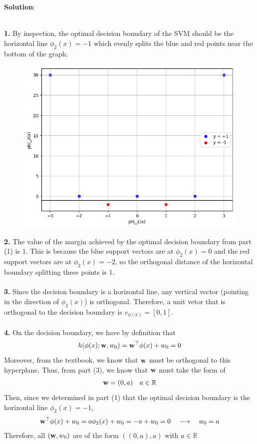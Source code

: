 \documentclass[submit]{../harvardml}
\newenvironment{solution}{
    \vspace{2mm}
    \color{blue}\noindent\textbf{Solution}:
}{}
\begin{document}
\begin{solution}
\\
\textbf{1.} By inspection, the optimal decision boundary of the SVM should be the horizontal line $\phi_2(x) = -1$ which evenly splits the blue and red points near the bottom of the graph.
\begin{figure}[H]
    \centering
    \includegraphics[width=0.8\linewidth]{hw4/img_output/p1.1.png}
\end{figure}
\textbf{2.} The value of the margin achieved by the optimal decision boundary from part (1) is $1$. This is because the blue support vectors are at $\phi_2(x) = 0$ and the red support vectors are at $\phi_2(x) = -2$, so the orthogonal distance of the horizontal boundary splitting these points is $1$. 
\\
\\
\textbf{3.} Since the decision boundary is a horizontal line, any vertical vector (pointing in the direction of $\phi_2(x)$) is orthogonal. Therefore, a unit vetor that is orthogonal to the decision boundary is $v_{\phi(x)} = [0,1]$.
\\
\\
\textbf{4.} On the decision boundary, we have by definition that
$$h(\mathbf{\phi}(x);\mathbf{w},w_0)=\mathbf{w}^\top\mathbf{\phi}(x) +w_0 = 0$$
Moreover, from the textbook, we know that $\mathbf{w}$ must be orthogonal to this hyperplane. Thus, from part (3), we know that $\mathbf{w}$ must take the form of
$$\mathbf{w} = (0,a) \quad a \in \mathbb{R}$$
Then, since we determined in part (1) that the optimal decision boundary is the horizontal line $\phi_2(x) = -1$, 
$$\mathbf{w}^\top\mathbf{\phi}(x) +w_0 = a \phi_2(x) + w_0 = -a + w_0 = 0 \quad \longrightarrow \quad w_0 = a$$
Therefore, all $(\mathbf{w}, w_0)$ are of the form $((0,a),a)$ with $a \in \mathbb{R}$
\\

\end{solution}
\end{document}
